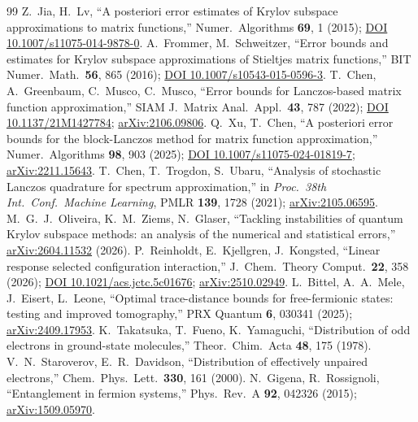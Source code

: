\begin{thebibliography}{99}
 Z.~Jia, H.~Lv, ``A posteriori error estimates of Krylov subspace approximations to matrix functions,'' Numer.\ Algorithms \textbf{69}, 1 (2015); \href{https://doi.org/10.1007/s11075-014-9878-0}{DOI 10.1007/s11075-014-9878-0}.
 A.~Frommer, M.~Schweitzer, ``Error bounds and estimates for Krylov subspace approximations of Stieltjes matrix functions,'' BIT Numer.\ Math.\ \textbf{56}, 865 (2016); \href{https://doi.org/10.1007/s10543-015-0596-3}{DOI 10.1007/s10543-015-0596-3}.
 T.~Chen, A.~Greenbaum, C.~Musco, C.~Musco, ``Error bounds for Lanczos-based matrix function approximation,'' SIAM J.\ Matrix Anal.\ Appl.\ \textbf{43}, 787 (2022); \href{https://doi.org/10.1137/21M1427784}{DOI 10.1137/21M1427784}; \href{https://arxiv.org/abs/2106.09806}{arXiv:2106.09806}.
 Q.~Xu, T.~Chen, ``A posteriori error bounds for the block-Lanczos method for matrix function approximation,'' Numer.\ Algorithms \textbf{98}, 903 (2025); \href{https://doi.org/10.1007/s11075-024-01819-7}{DOI 10.1007/s11075-024-01819-7}; \href{https://arxiv.org/abs/2211.15643}{arXiv:2211.15643}.
 T.~Chen, T.~Trogdon, S.~Ubaru, ``Analysis of stochastic Lanczos quadrature for spectrum approximation,'' in \emph{Proc.\ 38th Int.\ Conf.\ Machine Learning}, PMLR \textbf{139}, 1728 (2021); \href{https://arxiv.org/abs/2105.06595}{arXiv:2105.06595}.
 M.~G.~J.~Oliveira, K.~M.~Ziems, N.~Glaser, ``Tackling instabilities of quantum Krylov subspace methods: an analysis of the numerical and statistical errors,'' \href{https://arxiv.org/abs/2604.11532}{arXiv:2604.11532} (2026).
 P.~Reinholdt, E.~Kjellgren, J.~Kongsted, ``Linear response selected configuration interaction,'' J.\ Chem.\ Theory Comput.\ \textbf{22}, 358 (2026); \href{https://doi.org/10.1021/acs.jctc.5c01676}{DOI 10.1021/acs.jctc.5c01676}; \href{https://arxiv.org/abs/2510.02949}{arXiv:2510.02949}.
 L.~Bittel, A.~A.~Mele, J.~Eisert, L.~Leone, ``Optimal trace-distance bounds for free-fermionic states: testing and improved tomography,'' PRX Quantum \textbf{6}, 030341 (2025); \href{https://arxiv.org/abs/2409.17953}{arXiv:2409.17953}.
 K.~Takatsuka, T.~Fueno, K.~Yamaguchi, ``Distribution of odd electrons in ground-state molecules,'' Theor.\ Chim.\ Acta \textbf{48}, 175 (1978).
 V.~N.~Staroverov, E.~R.~Davidson, ``Distribution of effectively unpaired electrons,'' Chem.\ Phys.\ Lett.\ \textbf{330}, 161 (2000).
 N.~Gigena, R.~Rossignoli, ``Entanglement in fermion systems,'' Phys.\ Rev.\ A \textbf{92}, 042326 (2015); \href{https://arxiv.org/abs/1509.05970}{arXiv:1509.05970}.

\end{thebibliography}
